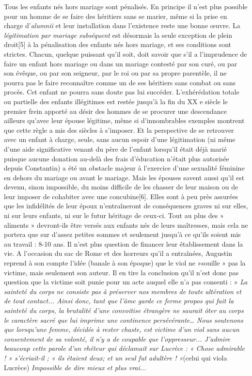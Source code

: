  Tous les enfants nés hors mariage sont pénalisés. En principe il n'est plus possible pour un homme de se faire des héritiers sans se marier, même si la prise en charge d'\emph{alumnii} et leur installation dans l'existence reste une bonne œuvre. La \emph{légitimation par mariage subséquent} est désormais la seule exception de plein droit[5] à la pénalisation des enfants nés hors mariage, et ses conditions sont strictes. Chacun, quelque puissant qu'il soit, doit savoir que s'il a l'imprudence de faire un enfant hors mariage ou dans un mariage contesté par son curé, ou par son évêque, ou par son seigneur, par le roi ou par sa propre parentèle, il ne pourra pas le faire reconnaître comme un de ses héritiers sans combat ou sans procès. Cet enfant ne pourra sans doute pas lui succéder. L'exhérédation totale ou partielle des enfants illégitimes est restée jusqu'à la fin du XX e siècle le premier frein apporté au désir des hommes de se procurer une descendance ailleurs qu'avec leur épouse légitime, même si d'innombrables exemples montrent que cette règle a mis des siècles à s'imposer.
 Et la perspective de se retrouver avec un enfant à charge, seule, sans aucun espoir d'une légitimation (ni même d'une aide significative venant du père de l'enfant lorsqu'il était déjà marié puisque aucune donation au-delà des frais d'éducation n'était plus autorisée depuis Constantin) a été un obstacle majeur à l'exercice d'une sexualité féminine en dehors du mariage ou avant le mariage. 
 Mais les épouses savent aussi qu'il est devenu, sinon impossible, du moins difficile de les chasser de leur maison ou de leur imposer de cohabiter avec une concubine[6]. Elles sont à peu près assurées que les infidélités de leur époux n'entraîneront de conséquences graves ni sur elles, ni sur leurs enfants, ni sur le futur héritage de ceux-ci. Tout au plus des » aliments » devront-ils être versés aux enfants nés de leurs maîtresses, mais cela ne portera que sur d'assez petites sommes et seulement jusqu'à ce qu'ils soient mis au travail : 8-10 ans. Il n'est plus question de financer leur établissement dans la vie. 
 A l'occasion du sac de Rome et des horreurs qu'il a entraînées, Augustin reprend à son compte l'idée (banale à son époque) que le viol ne »souille » pas la victime, mais seulement son auteur. Il en tire la conclusion qu'il n'est donc pas question que la victime soit punie pour un acte auquel elle n'a pas consenti : » \emph{La sainteté du corps ne consiste pas à préserver nos membres de toute altération et de tout contact... Ainsi donc, tant que l'âme garde ce ferme propos qui fait la sainteté du corps, la brutalité d'une convoitise étrangère ne saurait ôter au corps le caractère sacré que lui imprime une continence persévérante… Nous soutenons que lorsqu'une femme, décidée à rester chaste, est victime d'un viol sans aucun consentement de sa volonté, il n'y a de coupable que l'oppresseur... J'admire beaucoup cette parole d'un rhéteur qui déclamait sur Lucrèce : « Chose admirable ! » s'écriait-il ; « ils étaient deux; et un seul fut adultère ! »}(celui qui viola Lucrèce) \emph{Impossible de dire mieux et plus vrai...}

